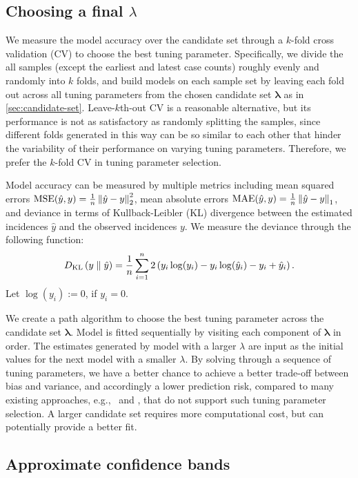 \subsection{Choosing a final $\lambda$}
\label{sec:cv}

We measure the model accuracy over the candidate set through a $k$-fold 
cross validation (CV) to choose the best tuning parameter. 
Specifically, we divide the all samples (except the earliest and latest case counts) 
roughly evenly and randomly into $k$ folds, and build models on each sample set 
by leaving each fold out across all tuning parameters from the chosen 
candidate set $\boldsymbol{\lambda}$ as in \autoref{sec:candidate-set}. 
% 
Leave-$k$th-out CV is a reasonable alternative, but its performance is 
not as satisfactory as randomly splitting the samples, since 
different folds generated in this way can be so similar to each other that hinder 
the variability of their performance on varying tuning parameters. Therefore, 
we prefer the $k$-fold CV in tuning parameter selection. 

Model accuracy can be measured by multiple metrics including mean squared errors 
$\mathrm{MSE}(\hat{y}, y) = \frac{1}{n}\left\lVert \hat{y} - y \right\rVert_2^2$, mean absolute errors 
$\mathrm{MAE}(\hat{y}, y) = \frac{1}{n}\left\lVert \hat{y} - y \right\rVert_1$, and 
deviance in terms of Kullback-Leibler (KL) divergence between the estimated 
incidences $\hat{y}$ and the observed incidences $y$. 
We measure the deviance through the following function: 
$$D_{\mathrm{KL}} \left(y \parallel \hat{y}\right) = \frac{1}{n} \sum_{i=1}^n 2\left(y_i \log(y_i) - y_i\log(\hat{y}_i) - y_i + \hat{y}_i\right).$$ 
Let $\log(y_i) := 0$, if $y_i=0$. 

We create a path algorithm to choose the best tuning parameter across the candidate 
set $\boldsymbol{\lambda}$. Model is fitted sequentially by visiting each component 
of $\boldsymbol{\lambda}$ in order. The estimates generated by model with a larger 
$\lambda$ are input as the initial values for the next model with a smaller $\lambda$. 
By solving through a sequence of tuning parameters, we have a better chance to 
achieve a better trade-off between bias and variance, and accordingly a lower prediction risk, 
compared to many existing approaches, e.g., \EpiEstim\ and \EpiLPS, that do not support 
such tuning parameter selection. 
A larger candidate set requires more computational cost, but can potentially 
provide a better fit. 


\subsection{Approximate confidence bands} 
\label{sec:conf-band} 

